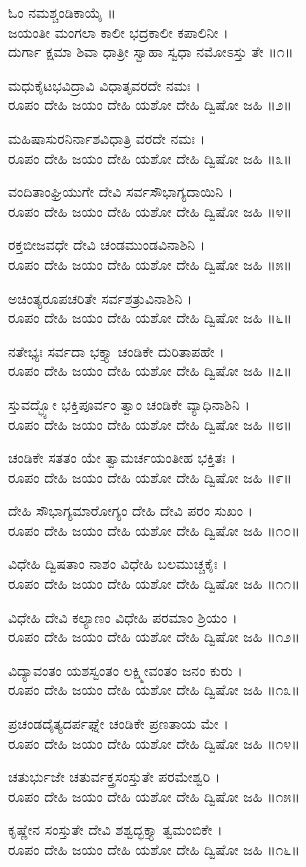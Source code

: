 ಓಂ ನಮಶ್ಚಂಡಿಕಾಯೈ ॥\\
ಜಯಂತೀ ಮಂಗಲಾ ಕಾಲೀ ಭದ್ರಕಾಲೀ ಕಪಾಲಿನೀ ।\\
ದುರ್ಗಾ ಕ್ಷಮಾ ಶಿವಾ ಧಾತ್ರೀ ಸ್ವಾಹಾ ಸ್ವಧಾ ನಮೋಽಸ್ತು ತೇ ॥೧॥

ಮಧುಕೈಟಭವಿದ್ರಾವಿ ವಿಧಾತೃವರದೇ ನಮಃ ।\\
ರೂಪಂ ದೇಹಿ ಜಯಂ ದೇಹಿ ಯಶೋ ದೇಹಿ ದ್ವಿಷೋ ಜಹಿ ॥೨॥

ಮಹಿಷಾಸುರನಿರ್ನಾಶವಿಧಾತ್ರಿ ವರದೇ ನಮಃ ।\\
ರೂಪಂ ದೇಹಿ ಜಯಂ ದೇಹಿ ಯಶೋ ದೇಹಿ ದ್ವಿಷೋ ಜಹಿ ॥೩॥

ವಂದಿತಾಂಘ್ರಿಯುಗೇ ದೇವಿ ಸರ್ವಸೌಭಾಗ್ಯದಾಯಿನಿ ।\\
ರೂಪಂ ದೇಹಿ ಜಯಂ ದೇಹಿ ಯಶೋ ದೇಹಿ ದ್ವಿಷೋ ಜಹಿ ॥೪॥

ರಕ್ತಬೀಜವಧೇ ದೇವಿ ಚಂಡಮುಂಡವಿನಾಶಿನಿ ।\\
ರೂಪಂ ದೇಹಿ ಜಯಂ ದೇಹಿ ಯಶೋ ದೇಹಿ ದ್ವಿಷೋ ಜಹಿ ॥೫॥

ಅಚಿಂತ್ಯರೂಪಚರಿತೇ ಸರ್ವಶತ್ರುವಿನಾಶಿನಿ ।\\
ರೂಪಂ ದೇಹಿ ಜಯಂ ದೇಹಿ ಯಶೋ ದೇಹಿ ದ್ವಿಷೋ ಜಹಿ ॥೬॥

ನತೇಭ್ಯಃ ಸರ್ವದಾ ಭಕ್ತ್ಯಾ ಚಂಡಿಕೇ ದುರಿತಾಪಹೇ ।\\
ರೂಪಂ ದೇಹಿ ಜಯಂ ದೇಹಿ ಯಶೋ ದೇಹಿ ದ್ವಿಷೋ ಜಹಿ ॥೭॥

ಸ್ತುವದ್ಭ್ಯೋ ಭಕ್ತಿಪೂರ್ವಂ ತ್ವಾಂ ಚಂಡಿಕೇ ವ್ಯಾಧಿನಾಶಿನಿ ।\\
ರೂಪಂ ದೇಹಿ ಜಯಂ ದೇಹಿ ಯಶೋ ದೇಹಿ ದ್ವಿಷೋ ಜಹಿ ॥೮॥

ಚಂಡಿಕೇ ಸತತಂ ಯೇ ತ್ವಾಮರ್ಚಯಂತೀಹ ಭಕ್ತಿತಃ ।\\
ರೂಪಂ ದೇಹಿ ಜಯಂ ದೇಹಿ ಯಶೋ ದೇಹಿ ದ್ವಿಷೋ ಜಹಿ ॥೯॥

ದೇಹಿ ಸೌಭಾಗ್ಯಮಾರೋಗ್ಯಂ ದೇಹಿ ದೇವಿ ಪರಂ ಸುಖಂ ।\\
ರೂಪಂ ದೇಹಿ ಜಯಂ ದೇಹಿ ಯಶೋ ದೇಹಿ ದ್ವಿಷೋ ಜಹಿ ॥೧೦॥

ವಿಧೇಹಿ ದ್ವಿಷತಾಂ ನಾಶಂ ವಿಧೇಹಿ ಬಲಮುಚ್ಚಕೈಃ ।\\
ರೂಪಂ ದೇಹಿ ಜಯಂ ದೇಹಿ ಯಶೋ ದೇಹಿ ದ್ವಿಷೋ ಜಹಿ ॥೧೧॥

ವಿಧೇಹಿ ದೇವಿ ಕಲ್ಯಾಣಂ ವಿಧೇಹಿ ಪರಮಾಂ ಶ್ರಿಯಂ ।\\
ರೂಪಂ ದೇಹಿ ಜಯಂ ದೇಹಿ ಯಶೋ ದೇಹಿ ದ್ವಿಷೋ ಜಹಿ ॥೧೨॥

ವಿದ್ಯಾವಂತಂ ಯಶಸ್ವಂತಂ ಲಕ್ಷ್ಮೀವಂತಂ ಜನಂ ಕುರು ।\\
ರೂಪಂ ದೇಹಿ ಜಯಂ ದೇಹಿ ಯಶೋ ದೇಹಿ ದ್ವಿಷೋ ಜಹಿ ॥೧೩॥

ಪ್ರಚಂಡದೈತ್ಯದರ್ಪಘ್ನೇ ಚಂಡಿಕೇ ಪ್ರಣತಾಯ ಮೇ ।\\
ರೂಪಂ ದೇಹಿ ಜಯಂ ದೇಹಿ ಯಶೋ ದೇಹಿ ದ್ವಿಷೋ ಜಹಿ ॥೧೪॥

ಚತುರ್ಭುಜೇ ಚತುರ್ವಕ್ತ್ರಸಂಸ್ತುತೇ ಪರಮೇಶ್ವರಿ ।\\
ರೂಪಂ ದೇಹಿ ಜಯಂ ದೇಹಿ ಯಶೋ ದೇಹಿ ದ್ವಿಷೋ ಜಹಿ ॥೧೫॥

ಕೃಷ್ಣೇನ ಸಂಸ್ತುತೇ ದೇವಿ ಶಶ್ವದ್ಭಕ್ತ್ಯಾ ತ್ವಮಂಬಿಕೇ ।\\
ರೂಪಂ ದೇಹಿ ಜಯಂ ದೇಹಿ ಯಶೋ ದೇಹಿ ದ್ವಿಷೋ ಜಹಿ ॥೧೬॥

